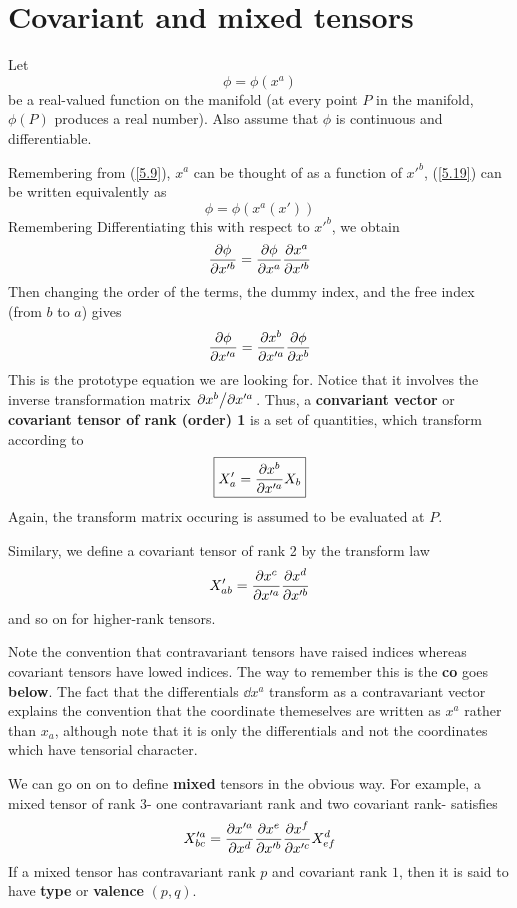 \section{Covariant and mixed tensors}
Let
\begin{equation}\label{5.19}
  \phi=\phi(x^{a})
\end{equation}
be a real-valued function on the manifold (at every point $P$ in the manifold, $\phi(P)$ produces a real number). Also assume that $\phi$ is continuous and differentiable.

Remembering from (\ref{5.9}), $x^{a}$ can be thought of as a function of $x'^b$, (\ref{5.19}) can be written equivalently as $$\phi=\phi(x^{a}(x'))$$ Remembering Differentiating this with respect to $x'^b$, we obtain 
\begin{equation*}
  \pdv{\phi}{x'^b}=\pdv{\phi}{x^{a}}\pdv{x^{a}}{x'^b }
\end{equation*}
Then changing the order of the terms, the dummy index, and the free index (from $b$ to $a$) gives
\begin{equation}\label{5.20}
  \pdv{\phi}{x'^{a}}=\pdv{x^b}{x'^{a}}\pdv{\phi}{x^b }
\end{equation}
This is the prototype equation we are looking for. Notice that it involves the inverse transformation matrix $\pdv*{x^b}{x'^{a}}$. Thus, a \textbf{convariant vector} or \textbf{covariant tensor of rank (order) 1} is a set of quantities, which transform according to 
\begin{equation}\label{5.21}
  \boxed{X'_a=\pdv{x^b}{x'^{a}}X_b}
\end{equation}
Again, the transform matrix occuring is assumed to be evaluated at $P$.

Similary, we define a covariant tensor of rank 2 by the transform law
\begin{equation}\label{5.22}
  X'_{ab} = \pdv{x^c}{x'^a}\pdv{x^d}{x'^b}
\end{equation}
and so on for higher-rank tensors.

Note the convention that contravariant tensors have raised indices whereas covariant tensors have lowed indices. The way to remember this is the \textbf{co} goes \textbf{below}. The fact that the differentials $\dd x^{a}$ transform as a contravariant vector explains the convention that the coordinate  themeselves are written as $x^{a}$ rather than $x_a$, although note that it is only the differentials and not the coordinates which have tensorial character. 

We can go on on to define \textbf{mixed} tensors in the obvious way. For example, a mixed tensor of rank 3- one contravariant rank and two covariant rank- satisfies
\begin{equation}\label{5.23}
  X'^{a}_{bc}=\pdv{x'^{a}}{x^d}\pdv{x^{e}}{x'^{b}}\pdv{x^f}{x'^{c}}X^{d}_{ef}
\end{equation}
If  a mixed tensor has contravariant rank $p$ and covariant rank $1$, then it is said to have \textbf{type} or \textbf{valence} $(p,q)$. 

